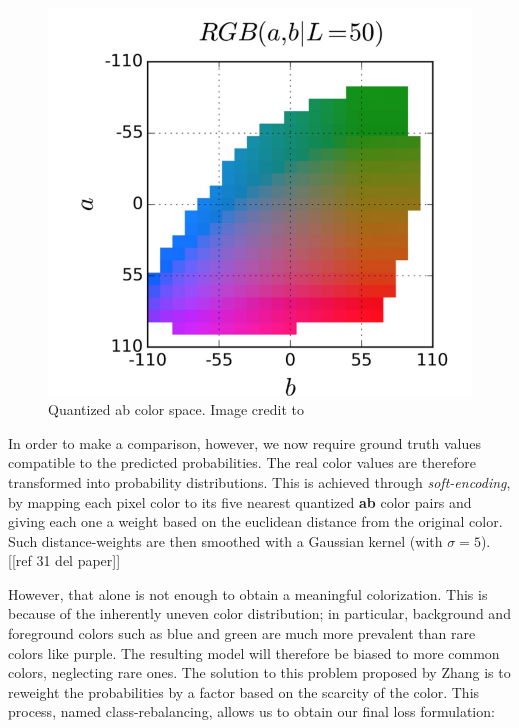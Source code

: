 \documentclass[twoside,twocolumn]{article}
\begin{document}
\begin{figure} [h]
	\includegraphics[width=\linewidth]{img/quantized.png}
	\caption{Quantized ab color space. Image credit to \cite{Zhang:2016}}
	\label{fig:quantized}
\end{figure}


In order to make a comparison, however, we now require ground truth values compatible to the predicted probabilities. The real color values are therefore transformed into probability distributions. This is achieved through \textit{soft-encoding}, by mapping each pixel color to its five nearest quantized \textbf{ab} color pairs and giving each one a weight based on the euclidean distance from the original color. Such distance-weights are then smoothed with a Gaussian kernel (with $\sigma=5$). [[ref 31 del paper]]

However, that alone is not enough to obtain a meaningful colorization. This is because of the inherently uneven color distribution; in particular, background and foreground colors such as blue and green are much more prevalent than rare colors like purple. The resulting model will therefore be biased to more common colors, neglecting rare ones. 
The solution to this problem proposed by Zhang \cite{Zhang:2016} is to reweight the probabilities by a factor based on the scarcity of the color. This process, named class-rebalancing, allows us to obtain our final loss formulation:
\end{document}
